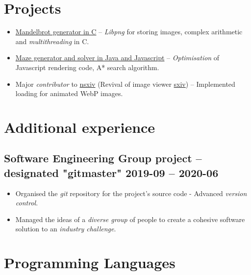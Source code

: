 \section{Projects}
        \begin{itemize}
            \item \href{https://github.com/Ytrewq13/mandelbrotc}{Mandelbrot generator in C}
    -- \emph{Libpng} for storing images, complex arithmetic and
    \emph{multithreading} in C.
            \item \href{https://github.com/Ytrewq13/mazemaker.git}{Maze generator and solver in Java and Javascript}
    -- \emph{Optimisation} of Javascript rendering code, A* search algorithm.
            \item Major \emph{contributor} to
                \href{https://github.com/nsxiv/nsxiv.git}{nsxiv} (Revival of
                image viewer \href{https://github.com/muennich/sxiv}{sxiv})
    -- Implemented loading for animated WebP images.
        \end{itemize}
\section{Additional experience}
    \subsection{Software Engineering Group project -- designated "gitmaster"
    \hfill 2019-09 -- 2020-06}
        \begin{itemize}
            \item Organised the \emph{git} repository for the project's source
                code - Advanced \emph{version control}.
            \item Managed the ideas of a \emph{diverse group} of people to
                create a cohesive software solution to an \emph{industry
                challenge}.
        \end{itemize}
\section{Programming Languages}
